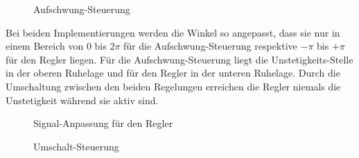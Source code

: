 \begin{figure}[H]
   \centering
   \caption[Aufschwung-Steuerung]{Aufschwung-Steuerung}
   \label{fig:Bild6.4}
\end{figure}

Bei beiden Implementierungen werden die Winkel so angepasst, dass sie nur in einem Bereich von $0$ bis $2\pi$ für die Aufschwung-Steuerung respektive $-\pi$ bis $+\pi$ für den Regler liegen. Für die Aufschwung-Steuerung liegt die Unstetigkeits-Stelle in der oberen Ruhelage und für den Regler in der unteren Ruhelage. Durch die Umschaltung zwischen den beiden Regelungen erreichen die Regler niemals die Unstetigkeit während sie aktiv sind.

\begin{figure}[H]
   \centering
   \caption[Signal-Anpassung für den Regler]{Signal-Anpassung für den Regler}
   \label{fig:Bild6.5}
\end{figure}

\begin{figure}[H]
   \centering
   \caption[Umschalt-Steuerung]{Umschalt-Steuerung}
   \label{fig:Bild6.6}
\end{figure}

